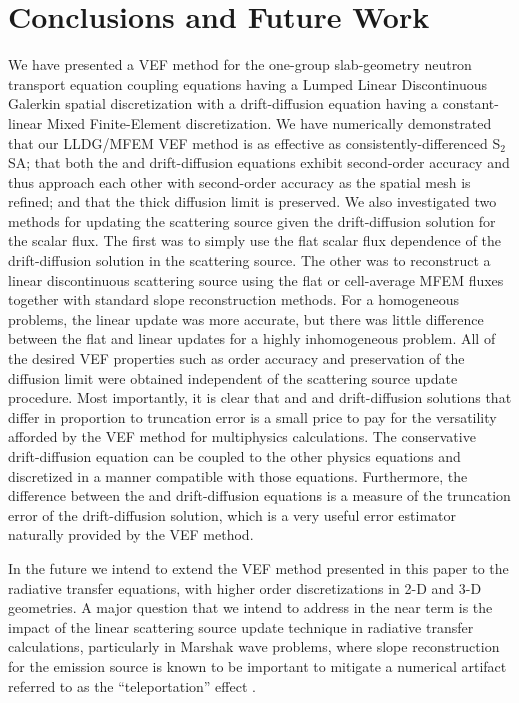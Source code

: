 
\section{Conclusions and Future Work}
We have presented a VEF method for the one-group slab-geometry neutron transport equation coupling \SN equations having a Lumped Linear Discontinuous Galerkin spatial discretization with a drift-diffusion equation having a constant-linear Mixed Finite-Element discretization. We have numerically demonstrated that our LLDG/MFEM VEF method is as effective as consistently-differenced S$_2$SA; 
that both the \SN and drift-diffusion equations exhibit second-order accuracy and thus approach each other with second-order accuracy as the spatial mesh is refined; and that the thick diffusion limit is preserved.  We also investigated two methods for updating the \SN scattering source given the drift-diffusion solution for the scalar flux. The first was to simply use the flat scalar flux dependence of the drift-diffusion solution in the \SN scattering source.  The other was to reconstruct a linear discontinuous scattering source 
using the flat or cell-average MFEM fluxes together with standard slope reconstruction methods. For a homogeneous problems, the linear update was more accurate, but there was little difference between the flat and linear updates for a highly inhomogeneous problem.  All of the desired VEF properties such as order accuracy and preservation of the diffusion limit were obtained independent of the scattering source update procedure. Most importantly, it is clear that \SN and and drift-diffusion solutions that differ in proportion to truncation 
error is a small price to pay for the versatility afforded by the VEF method for multiphysics calculations. The conservative drift-diffusion equation can be coupled to the other physics equations and discretized in a manner compatible with those equations.  Furthermore, the difference between the \SN and drift-diffusion equations is a measure of the truncation error of the drift-diffusion solution, which is a very useful error estimator naturally provided by the VEF method.  


In the future we intend to extend the VEF method presented in this paper to the radiative transfer equations, with higher order discretizations in 2-D and 3-D geometries.  A major question that we intend to address in the near term is the impact of the linear 
scattering source update technique in radiative transfer calculations, particularly in Marshak wave problems, where slope reconstruction 
for the emission source is known to be important to mitigate a numerical artifact referred to as the ``teleportation'' effect  \cite{tele}. 